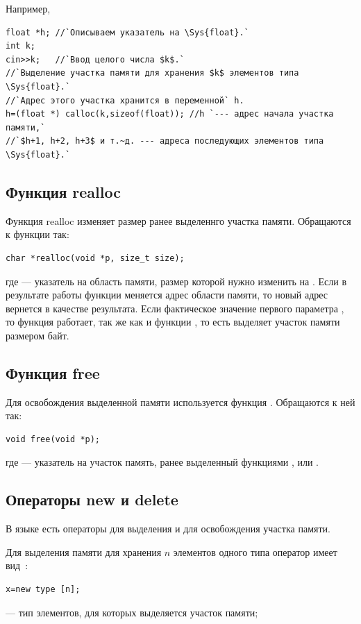 Например,
\begin{lstlisting}
float *h; //`Описываем указатель на \Sys{float}.`
int k;
cin>>k;   //`Ввод целого числа $k$.`
//`Выделение участка памяти для хранения $k$ элементов типа \Sys{float}.` 
//`Адрес этого участка хранится в переменной` h.
h=(float *) calloc(k,sizeof(float)); //h `--- адрес начала участка памяти,` 
//`$h+1, h+2, h+3$ и т.~д. --- адреса последующих элементов типа \Sys{float}.`
\end{lstlisting}

\subsection[Функция realloc]{Функция realloc}
Функция realloc изменяет размер ранее выделеннго участка памяти. Обращаются к функции так:
\begin{lstlisting}
char *realloc(void *p, size_t size);
\end{lstlisting}
где  --- указатель на область памяти, размер которой нужно изменить на . Если в
результате работы функции меняется адрес области памяти, то новый адрес вернется в качестве результата. Если
фактическое значение первого параметра , то функция  работает, так же
как и функции , то есть выделяет участок памяти размером  байт.

\subsection[Функция free]{Функция free}
Для освобождения выделенной памяти используется функция . Обращаются к ней так:
\begin{lstlisting}
void free(void *p);
\end{lstlisting}
где  --- указатель на участок память, ранее выделенный функциями ,
 или .

\subsection[Операторы new и delete]{Операторы new и delete}
В языке  есть операторы  для выделения и
 для освобождения участка памяти.

Для выделения памяти для хранения $n$ элементов одного типа оператор  имеет вид~\cite{OOP}:%
\begin{lstlisting}
x=new type [n];
\end{lstlisting}
 --- тип элементов, для которых выделяется участок памяти;

